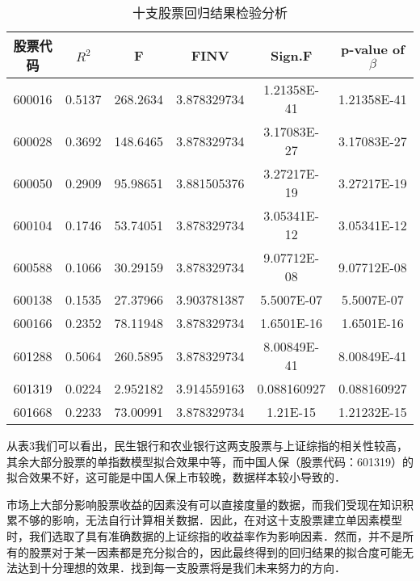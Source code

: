 \begin{table}[ht]
\centering
\caption{十支股票回归结果检验分析}\label{inv9_tab3}
\begin{tabular}{|c|c|c|c|c|c|}
\hline
股票代码 & $R^{2}$ & F & FINV& Sign.F & p-value of $\beta$\\
\hline
600016 & 0.5137 & 268.2634 & 3.878329734& 1.21358E-41 & 1.21358E-41\\
\hline
600028 & 0.3692 & 148.6465 & 3.878329734 & 3.17083E-27 & 3.17083E-27\\
\hline
600050 & 0.2909 & 95.98651 &3.881505376& 3.27217E-19 & 3.27217E-19\\
\hline
600104 & 0.1746 & 53.74051 &3.878329734& 3.05341E-12 & 3.05341E-12\\
\hline
600588 & 0.1066 & 30.29159 &3.878329734& 9.07712E-08 & 9.07712E-08\\
\hline
600138 & 0.1535 & 27.37966 &3.903781387& 5.5007E-07 & 5.5007E-07\\
\hline
600166 & 0.2352 & 78.11948 &3.878329734& 1.6501E-16 & 1.6501E-16\\
\hline
601288 & 0.5064 & 260.5895 & 3.878329734&8.00849E-41 & 8.00849E-41\\
\hline
601319 & 0.0224 & 2.952182 &3.914559163& 0.088160927 & 0.088160927\\
\hline
601668 & 0.2233 & 73.00991 &3.878329734 & 1.21E-15 & 1.21232E-15\\
\hline
\end{tabular}
\end{table}

从表3我们可以看出，民生银行和农业银行这两支股票与上证综指的相关性较高，其余大部分股票的单指数模型拟合效果中等，而中国人保（股票代码：601319）的拟合效果不好，这可能是中国人保上市较晚，数据样本较小导致的．

市场上大部分影响股票收益的因素没有可以直接度量的数据，而我们受现在知识积累不够的影响，无法自行计算相关数据．因此，在对这十支股票建立单因素模型时，我们选取了具有准确数据的上证综指的收益率作为影响因素．然而，并不是所有的股票对于某一因素都是充分拟合的，因此最终得到的回归结果的拟合度可能无法达到十分理想的效果．找到每一支股票将是我们未来努力的方向．










